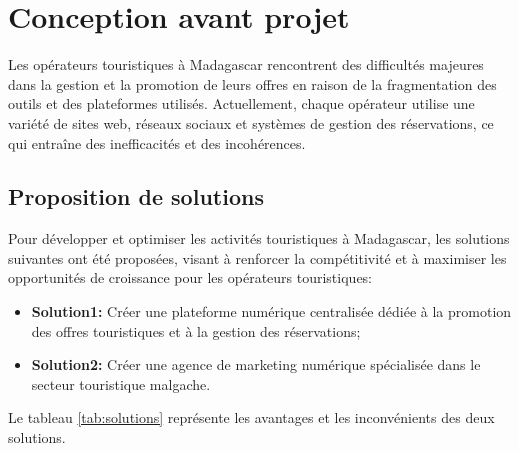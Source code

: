 \documentclass[12pt]{report}
\begin{document}
				\section{Conception avant projet}
				
				\hspace{15pt} Les opérateurs touristiques à Madagascar rencontrent des difficultés majeures dans la gestion et la promotion de leurs offres en raison de la fragmentation des outils et des plateformes utilisés. Actuellement, chaque opérateur utilise une variété de sites web, réseaux sociaux et systèmes de gestion des réservations, ce qui entraîne des inefficacités et des incohérences.

				\subsection{Proposition de solutions}

				\hspace{15pt} Pour développer et optimiser les activités touristiques à Madagascar, les solutions suivantes ont été proposées, visant à renforcer la compétitivité et à maximiser les opportunités de croissance pour les opérateurs touristiques:

				\begin{itemize}
					\item \textbf{Solution1:} Créer une plateforme numérique centralisée dédiée à la promotion des offres touristiques et à la gestion des réservations;
					\item \textbf{Solution2:} Créer une agence de marketing numérique spécialisée dans le secteur touristique malgache.
				\end{itemize}

				Le tableau \ref{tab:solutions} représente les avantages et les inconvénients des deux solutions.
\end{document}
